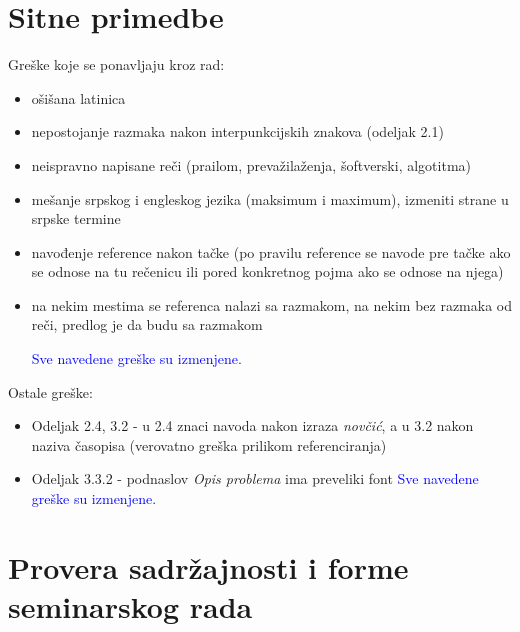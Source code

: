 \documentclass[a4paper]{report}
\newcommand{\odgovor}[1]{\textcolor{blue}{#1}}
\begin{document}
\section{Sitne primedbe}
Greške koje se ponavljaju kroz rad:
\begin{itemize}
	\item ošišana latinica
	\item nepostojanje razmaka nakon interpunkcijskih znakova (odeljak 2.1)
	\item neispravno napisane reči (prailom, prevažilaženja, šoftverski, algotitma) 
	\item mešanje srpskog i engleskog jezika (maksimum i maximum), izmeniti strane u srpske termine
	\item navođenje reference nakon tačke (po pravilu reference se navode pre tačke ako se odnose na tu rečenicu ili pored konkretnog pojma ako se odnose na njega)
	\item na nekim mestima se referenca nalazi sa razmakom, na nekim bez razmaka od reči, predlog je da budu sa razmakom 
	
	\odgovor {Sve navedene greške su izmenjene.}
\end{itemize}

Ostale greške:
\begin{itemize}
	\item Odeljak 2.4, 3.2 - u 2.4 znaci navoda nakon izraza \textit{novčić}, a u 3.2 nakon naziva časopisa (verovatno greška prilikom referenciranja)
	\item Odeljak 3.3.2 - podnaslov \textit{Opis problema} ima preveliki font
		\odgovor {Sve navedene greške su izmenjene.}
\end{itemize}
\section{Provera sadržajnosti i forme seminarskog rada}
\end{document}
